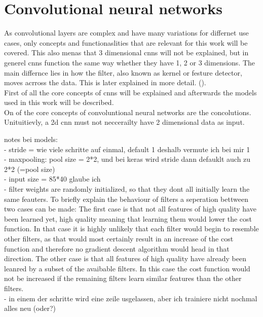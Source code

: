 \chapter{Convolutional neural networks}
As convolutional layers are complex and have many variations for differnet use cases, only concepts and functionaslities that are relevant for this work will be covered. This also menas that 3 dimensional cnns will not be explained, but in generel cnns function the same way whether they have 1, 2 or 3 dimensions. The main differnce lies in how the filter, also known as kernel or festure detector, moves acrross the data. This is later explained in more detail. (). \\
 First of all the core concepts of cnns will be explained and afterwards the models used in this work will be described.\\

On of the core concepts of convoluntional neural networks are the concolutions. \\




Unituitievly, a 2d cnn must not neccerailty have 2 dimensional data as input.

notes bei models:\\
- stride = wie viele schritte auf einmal, default 1 deshalb vermute ich bei mir 1\\
- maxpooling: pool size = 2*2, und bei keras wird stride dann defauklt auch zu 2*2 (=pool size)\\
- input size = 85*40 glaube ich\\
- filter weights are randomly initialized, so that they dont all initially learn the same feauters. To briefly explain the behaviour of filters a seperation bettween two cases can be made: The first case is that not all features of high quality have been learned yet, high quality meaning that learning them would lower the cost function. In that case it is highly unlikely that each filter would begin to resemble other filters, as that would most certainly result in an increase of the cost function and therefore no gradient descent algorithm would head in that direction. The other case is that all features of high quality have already been leanred by a subset of the avaibable filters. In this case the cost function would not be increased if the remaining filters learn similar features than the other filters. \\
- in einem der schritte wird eine zeile usgelassen, aber ich trainiere nicht nochmal alles neu (oder?)\\

